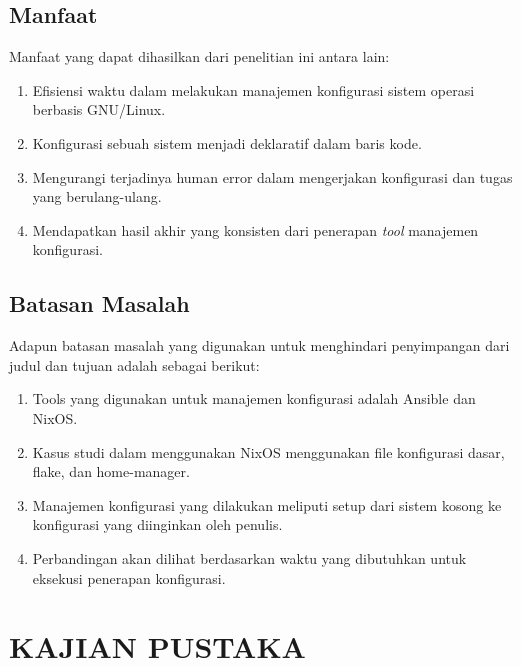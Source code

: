 \documentclass[10pt,]{report}
\begin{document}
\section{Manfaat}
\vspace{-3mm}
\begin{adjustwidth}{0.70cm}{}
	Manfaat yang dapat dihasilkan dari penelitian ini antara lain:
	\begin{enumerate}[leftmargin=0.45cm]
		\item Efisiensi waktu dalam melakukan manajemen konfigurasi sistem operasi berbasis GNU/Linux.
		\item Konfigurasi sebuah sistem menjadi deklaratif dalam baris kode.
		\item Mengurangi terjadinya human error dalam mengerjakan konfigurasi dan tugas yang berulang-ulang.
		\item Mendapatkan hasil akhir yang konsisten dari penerapan \textit{tool} manajemen konfigurasi.
	\end{enumerate}
\end{adjustwidth}
\vspace{3mm}
\section{Batasan Masalah}
\vspace{-3mm}
\begin{adjustwidth}{0.70cm}{}
	Adapun batasan masalah yang digunakan untuk menghindari penyimpangan dari judul dan tujuan adalah sebagai berikut:
	\begin{enumerate}[leftmargin=0.45cm]
		\item Tools yang digunakan untuk manajemen konfigurasi adalah Ansible dan
		      NixOS.
		\item Kasus studi dalam menggunakan NixOS menggunakan file konfigurasi
		      dasar, flake, dan home-manager.
		\item Manajemen konfigurasi yang dilakukan meliputi setup dari sistem
		      kosong ke konfigurasi yang diinginkan oleh penulis.
		\item Perbandingan akan dilihat berdasarkan waktu yang dibutuhkan untuk
		      eksekusi penerapan konfigurasi.
	\end{enumerate}
\end{adjustwidth}
\chapter{KAJIAN PUSTAKA}
\end{document}
